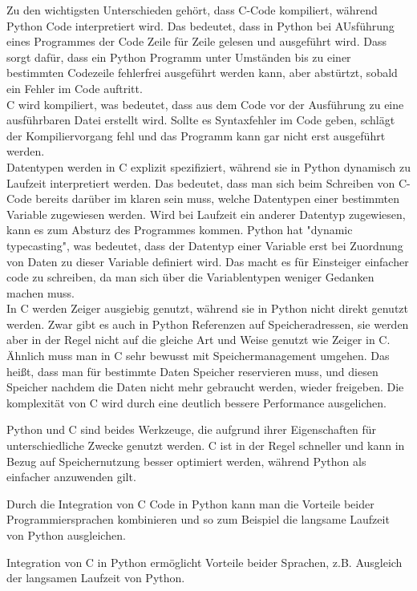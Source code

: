 \documentclass[a4paper, parskip=half]{scrartcl}
\begin{document}
Zu den wichtigsten Unterschieden gehört, dass C-Code kompiliert, während Python Code interpretiert wird. Das bedeutet, dass in Python bei AUsführung eines Programmes der Code Zeile für Zeile gelesen und ausgeführt wird. Dass sorgt dafür, dass ein Python Programm unter Umständen bis zu einer bestimmten Codezeile fehlerfrei ausgeführt werden kann, aber abstürtzt, sobald ein Fehler im Code auftritt.\\ 
C wird kompiliert, was bedeutet, dass aus dem Code vor der Ausführung zu eine ausführbaren Datei erstellt wird. Sollte es Syntaxfehler im Code geben, schlägt der Kompiliervorgang fehl und das Programm kann gar nicht erst ausgeführt werden. \\
Datentypen werden in C explizit spezifiziert, während sie in Python dynamisch zu Laufzeit interpretiert werden. Das bedeutet, dass man sich beim Schreiben von C-Code bereits darüber im klaren sein muss, welche Datentypen einer bestimmten Variable zugewiesen werden. Wird bei Laufzeit ein anderer Datentyp zugewiesen, kann es zum Absturz des Programmes kommen. 
Python hat "dynamic typecasting", was bedeutet, dass der Datentyp einer Variable erst bei Zuordnung von Daten zu dieser Variable definiert wird. 
Das macht es für Einsteiger einfacher code zu schreiben, da man sich über die Variablentypen weniger Gedanken machen muss.\\ 
In C werden Zeiger ausgiebig genutzt, während sie in Python nicht direkt genutzt werden. Zwar gibt es auch in Python Referenzen auf Speicheradressen, sie werden aber in der Regel nicht auf die gleiche Art und Weise genutzt wie Zeiger in C.\\
Ähnlich muss man in C sehr bewusst mit Speichermanagement umgehen. Das heißt, dass man für bestimmte Daten Speicher reservieren muss, und diesen Speicher nachdem die Daten nicht mehr gebraucht werden, wieder freigeben. 
Die komplexität von C wird durch eine deutlich bessere Performance ausgelichen.

Python und C sind beides Werkzeuge, die aufgrund ihrer Eigenschaften für unterschiedliche Zwecke genutzt werden. C ist in der Regel schneller und kann in Bezug auf Speichernutzung besser optimiert werden, während Python als einfacher anzuwenden gilt. 

Durch die Integration von C Code in Python kann man die Vorteile beider Programmiersprachen kombinieren und so zum Beispiel die langsame Laufzeit von Python ausgleichen.


Integration von C in Python ermöglicht Vorteile beider Sprachen, z.B. Ausgleich der langsamen Laufzeit von Python.\\
\end{document}
